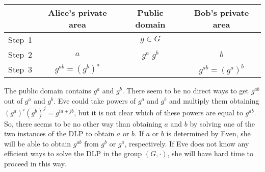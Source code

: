 \documentclass{beamer}
\begin{document}
\begin{frame} 
\begin{tabular}{c||c|c|c}
	& Alice's private area & Public domain & Bob's private area \\ \hline  
	\hline 
	Step~1 & & $g \in G$ & \\ 
	Step~2 & $a$ & $g^a$ \qquad $g^b$ & $b$ \\
	Step~3 & $g^{ab} = (g^b)^a$ & & $g^{ab} = (g^a)^b$ \\
	\hline 
\end{tabular} 
\end{frame} 

\begin{frame} 
	The public domain contains $g^a$ and $g^b$. There seem to be no direct ways to get $g^{ab}$ out of $g^a$ and $g^b$. Eve could take powers of $g^a$ and $g^b$ and multiply them obtaining $(g^a)^i (g^b)^j = g^{i a + j b}$, but it is not clear which of these powers are equal to $g^{ab}$. So, there seems to be no other way than obtaining $a$ and $b$ by solving one of the two instances of the DLP to obtain $a$ or $b$. If $a$ or $b$ is determined by Even, she will be able to obtain $g^{ab}$ from $g^b$ or $g^a$, respectively. If Eve does not know any efficient ways to solve the DLP in the group $(G,\cdot)$, she will have hard time to proceed in this way. 
\end{frame} 
\end{document}
